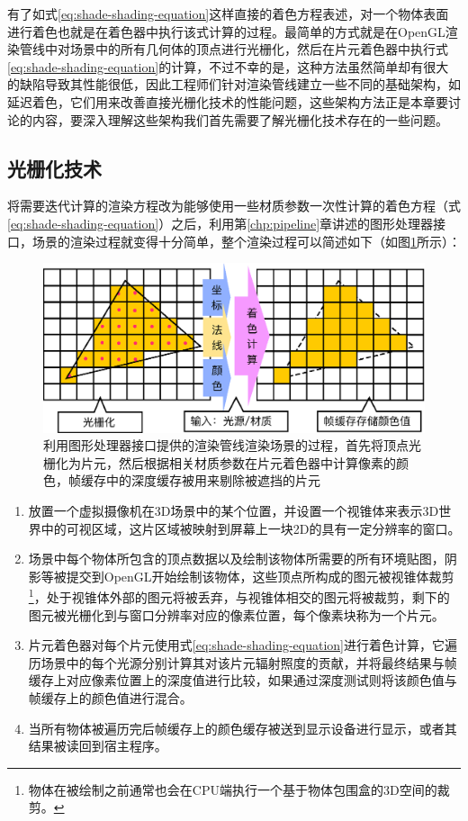 有了如式\ref{eq:shade-shading-equation}这样直接的着色方程表述，对一个物体表面进行着色也就是在着色器中执行该式计算的过程。最简单的方式就是在OpenGL渲染管线中对场景中的所有几何体的顶点进行光栅化，然后在片元着色器中执行式\ref{eq:shade-shading-equation}的计算，不过不幸的是，这种方法虽然简单却有很大的缺陷导致其性能很低，因此工程师们针对渲染管线建立一些不同的基础架构，如延迟着色，它们用来改善直接光栅化技术的性能问题，这些架构方法正是本章要讨论的内容，要深入理解这些架构我们首先需要了解光栅化技术存在的一些问题。





\subsection{光栅化技术}
将需要迭代计算的渲染方程改为能够使用一些材质参数一次性计算的着色方程（式\ref{eq:shade-shading-equation}）之后，利用第\ref{chp:pipeline}章讲述的图形处理器接口，场景的渲染过程就变得十分简单，整个渲染过程可以简述如下（如图\ref{f:shade-pipeline}所示）：

\begin{figure}
\begin{center}
	\includegraphics[width=.78\textwidth]{figures/shade/pipeline}
\end{center}
	\caption{利用图形处理器接口提供的渲染管线渲染场景的过程，首先将顶点光栅化为片元，然后根据相关材质参数在片元着色器中计算像素的颜色，帧缓存中的深度缓存被用来剔除被遮挡的片元}
	\label{f:shade-pipeline}
\end{figure}

\begin{enumerate}
	\item 放置一个虚拟摄像机在3D场景中的某个位置，并设置一个视锥体来表示3D世界中的可视区域，这片区域被映射到屏幕上一块2D的具有一定分辨率的窗口。
	\item 场景中每个物体所包含的顶点数据以及绘制该物体所需要的所有环境贴图，阴影等被提交到OpenGL开始绘制该物体，这些顶点所构成的图元被视锥体裁剪\footnote{物体在被绘制之前通常也会在CPU端执行一个基于物体包围盒的3D空间的裁剪。}，处于视锥体外部的图元将被丢弃，与视锥体相交的图元将被裁剪，剩下的图元被光栅化到与窗口分辨率对应的像素位置，每个像素块称为一个片元。
	\item 片元着色器对每个片元使用式\ref{eq:shade-shading-equation}进行着色计算，它遍历场景中的每个光源分别计算其对该片元辐射照度的贡献，并将最终结果与帧缓存上对应像素位置上的深度值进行比较，如果通过深度测试则将该颜色值与帧缓存上的颜色值进行混合。
	\item 当所有物体被遍历完后帧缓存上的颜色缓存被送到显示设备进行显示，或者其结果被读回到宿主程序。
\end{enumerate}

